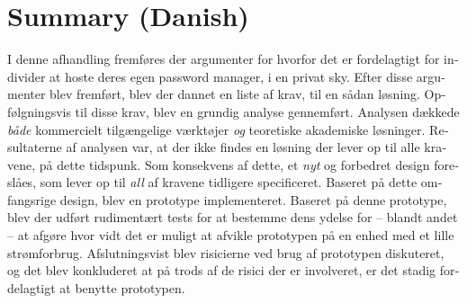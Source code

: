\chapter{Summary (Danish)}
	\begin{otherlanguage}{danish}
		I denne afhandling fremføres der argumenter for hvorfor det er fordelagtigt for individer at hoste deres egen password manager, i en privat sky. Efter disse argumenter blev fremført, blev der dannet en liste af krav, til en sådan løsning. Opfølgningsvis til disse krav, blev en grundig analyse gennemført. Analysen dækkede \emph{både} kommercielt tilgængelige værktøjer \emph{og} teoretiske akademiske løsninger. Resultaterne af analysen var, at der ikke findes en løsning der lever op til alle kravene, på dette tidspunk. Som konsekvens af dette, et \emph{nyt} og forbedret design foreslåes, som lever op til \emph{all} af kravene tidligere specificeret. Baseret på dette omfangsrige design, blev en prototype implementeret. Baseret på denne prototype, blev der udført rudimentært tests for at bestemme dens ydelse for -- blandt andet -- at afgøre hvor vidt det er muligt at afvikle prototypen på en enhed med et lille strømforbrug. Afslutningsvist blev risicierne ved brug af prototypen diskuteret, og det blev konkluderet at på trods af de risici der er involveret, er det stadig fordelagtigt at benytte prototypen.
	\end{otherlanguage}
